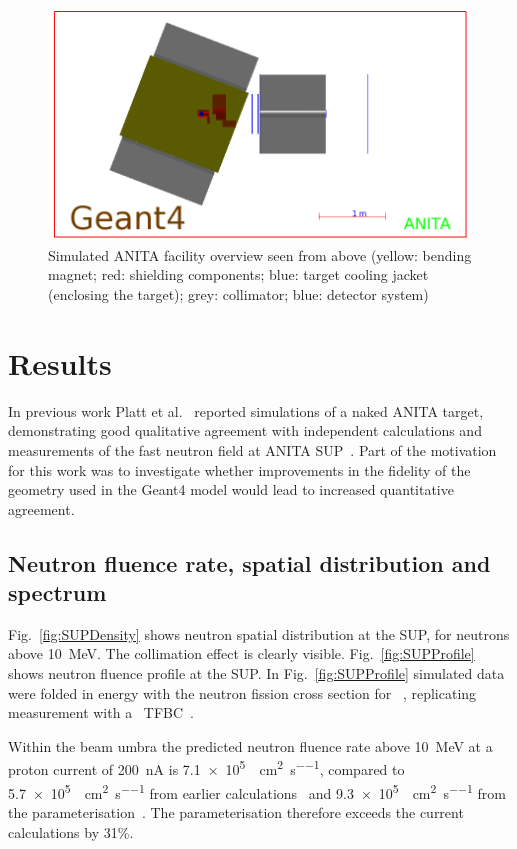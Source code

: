 \documentclass[11pt,a4paper]{IEEEtran}
\let\MYoriglatexcaption\caption
\renewcommand{\caption}[2][\relax]{\MYoriglatexcaption[#2]{#2}}
\def\U238{\BPChem{\^{238}U}}
\begin{document}
\begin{figure}[t]
	\centering
	\includegraphics[width=\columnwidth]{overview.png}
	\caption{
        Simulated ANITA facility overview seen from above (yellow: bending magnet; red: shielding components; blue: target cooling jacket (enclosing the target); grey: collimator; blue: detector system)
    }
	\label{fig:ANITAoverview}
\end{figure}

\section{Results}
In previous work Platt et al.~\cite{Platt13} reported simulations of a naked ANITA target, demonstrating good qualitative agreement with independent calculations and measurements of the fast neutron field at ANITA SUP~\cite{Prokofiev2009}.
Part of the motivation for this work was to investigate whether improvements in the fidelity of the geometry used in the Geant4 model would lead to increased quantitative agreement.

\subsection{Neutron fluence rate, spatial distribution and spectrum}
Fig.~\ref{fig:SUPDensity} shows neutron spatial distribution at the SUP, for neutrons above \SI{10}{\MeV}.
The collimation effect is clearly visible.
Fig.~\ref{fig:SUPProfile} shows neutron fluence profile at the SUP.
In Fig.~\ref{fig:SUPProfile} simulated data were folded in energy with the neutron fission cross section for \U238~\cite{tbd}, replicating measurement with a \U238\ TFBC~\cite{Prokofiev2009}.

Within the beam umbra the predicted neutron fluence rate above \SI{10}{\MeV} at a proton current of \SI{200}{\nA} is \SI{7.1e5}{\neutron\per\cm\squared\per\second}, compared to \SI{5.7e5}{\neutron\per\cm\squared\per\second} from earlier calculations~\cite{Platt13} and \SI{9.3e5}{\neutron\per\cm\squared\per\second} from the parameterisation~\cite{Prokofiev2009}.
The parameterisation therefore exceeds the current calculations by 31\%.
\end{document}
